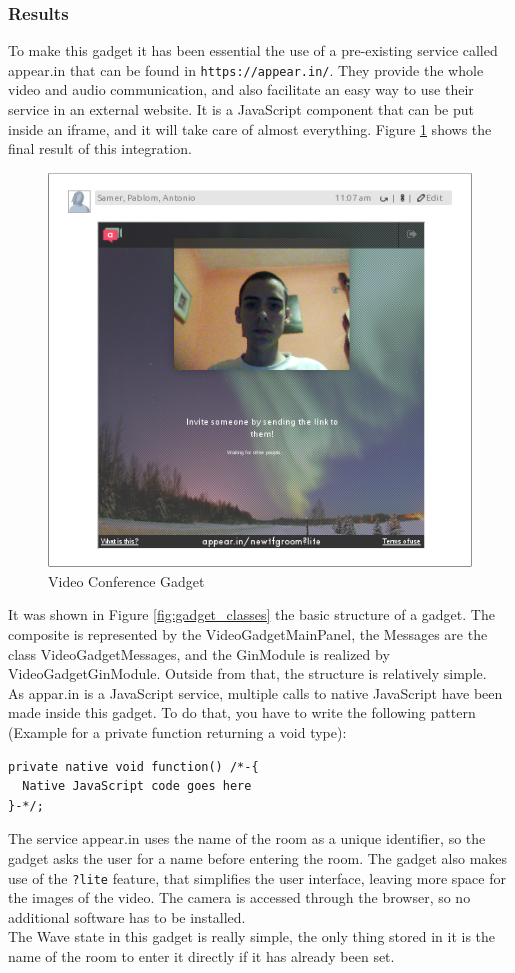 \subsubsection{Results}
To make this gadget it has been essential the use of a pre-existing service called appear.in that can be found in \verb|https://appear.in/|. They provide the whole video and audio communication, and also facilitate an easy way to use their service in an external website. It is a JavaScript component that can be put inside an iframe, and it will take care of almost everything. Figure \ref{fig:video_gadget} shows the final result of this integration.
\begin{figure}[H]
  \center
    \includegraphics[keepaspectratio, scale=0.5]{Media/Captures/Extensions/VideoGadget.png}
  \caption{Video Conference Gadget}
  \label{fig:video_gadget}
\end{figure}
It was shown in Figure \ref{fig:gadget_classes} the basic structure of a gadget. The composite is represented by the VideoGadgetMainPanel, the Messages are the class VideoGadgetMessages, and the GinModule is realized by VideoGadgetGinModule. Outside from that, the structure is relatively simple.\\[.2cm]
As appar.in is a JavaScript service, multiple calls to native JavaScript have been made inside this gadget. To do that, you have to write the following pattern (Example for a private function returning a void type):
\begin{verbatim}
private native void function() /*-{
  Native JavaScript code goes here
}-*/;
\end{verbatim}
The service appear.in uses the name of the room as a unique identifier, so the gadget asks the user for a name before entering the room. The gadget also makes use of the \verb|?lite| feature, that simplifies the user interface, leaving more space for the images of the video. The camera is accessed through the browser, so no additional software has to be installed.\\[.2cm]
The Wave state in this gadget is really simple, the only thing stored in it is the name of the room to enter it directly if it has already been set.
